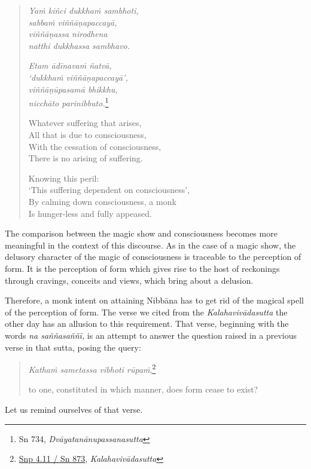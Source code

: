 \begin{quote}
\emph{Yaṁ kiñci dukkhaṁ sambhoti,}\\
\emph{sabbaṁ viññāṇapaccayā,}\\
\emph{viññāṇassa nirodhena}\\
\emph{natthi dukkhassa sambhavo.}

\emph{Etam ādīnavaṁ ñatvā,}\\
\emph{`dukkhaṁ viññāṇapaccayā',}\\
\emph{viññāṇūpasamā bhikkhu,}\\
\emph{nicchāto parinibbuto.}\footnote{Sn 734, \emph{Dvāyatanānupassanasutta}}

Whatever suffering that arises,\\
All that is due to consciousness,\\
With the cessation of consciousness,\\
There is no arising of suffering.

Knowing this peril:\\
`This suffering dependent on consciousness',\\
By calming down consciousness, a monk\\
Is hunger-less and fully appeased.
\end{quote}

The comparison between the magic show and consciousness becomes more meaningful in the context of this discourse. As in the case of a magic show, the delusory character of the magic of consciousness is traceable to the perception of form. It is the perception of form which gives rise to the host of reckonings through cravings, conceits and views, which bring about a delusion.

Therefore, a monk intent on attaining Nibbāna has to get rid of the magical spell of the perception of form. The verse we cited from the \emph{Kalahavivādasutta} the other day has an allusion to this requirement. That verse, beginning with the words \emph{na saññasaññī,} is an attempt to answer the question raised in a previous verse in that sutta, posing the query:

\begin{quote}
\emph{Kathaṁ sametassa vibhoti rūpaṁ},\footnote{\href{https://suttacentral.net/snp4.11/pli/ms}{Snp 4.11 / Sn 873}, \emph{Kalahavivādasutta}}

to one, constituted in which manner, does form cease to exist?
\end{quote}

Let us remind ourselves of that verse.

